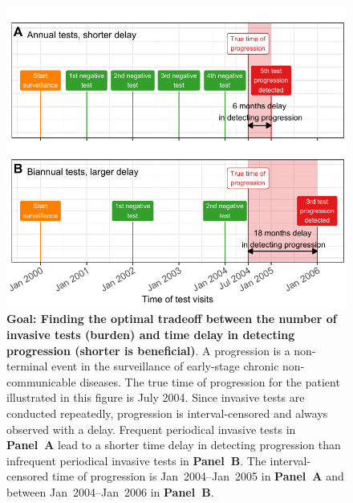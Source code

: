 \begin{figure}
\centerline{\includegraphics{contents/c4/images/c4_fig1.pdf}}
\caption{\textbf{Goal: Finding the optimal tradeoff between the number of invasive tests (burden) and time delay in detecting progression (shorter is beneficial)}. A progression is a non-terminal event in the surveillance of early-stage chronic non-communicable diseases. The true time of progression for the patient illustrated in this figure is July 2004. Since invasive tests are conducted repeatedly, progression is interval-censored and always observed with a delay. Frequent periodical invasive tests in \textbf{Panel~A} lead to a shorter time delay in detecting progression than infrequent periodical invasive tests in \textbf{Panel~B}. The interval-censored time of progression is Jan~2004--Jan~2005 in \textbf{Panel~A} and between Jan~2004--Jan~2006 in \textbf{Panel~B}.}
\label{c4:fig:1}
\end{figure}

